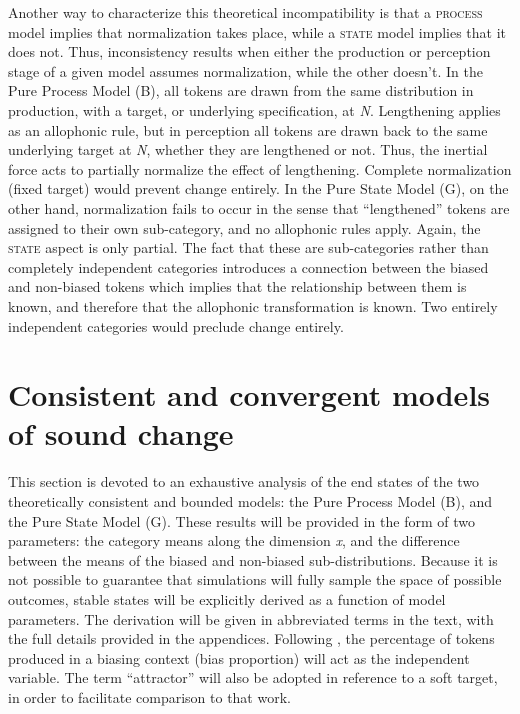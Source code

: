 Another way to characterize this theoretical incompatibility is that
a \textsc{process} model implies that normalization takes place, while
a \textsc{state} model implies that it does not. Thus, inconsistency
results when either the production or perception stage of a given
model assumes normalization, while the other doesn't. In the Pure
Process Model (B), all tokens are drawn from the same distribution
in production, with a target, or underlying specification, at \emph{N}.
Lengthening applies as an allophonic rule, but in perception all tokens
are drawn back to the same underlying target at \emph{N}, whether
they are lengthened or not. Thus, the inertial force acts to partially
normalize the effect of lengthening. Complete normalization (fixed
target) would prevent change entirely. In the Pure State Model (G),
on the other hand, normalization fails to occur in the sense that
``lengthened'' tokens are assigned to their own sub-category, and no
allophonic rules apply. Again, the \textsc{state} aspect is only partial.
The fact that these are sub-categories rather than completely independent
categories introduces a connection between the biased and non-biased
tokens which implies that the relationship between them is known,
and therefore that the allophonic transformation is known. Two entirely
independent categories would preclude change entirely. 

\section{\label{sec:Model-Behavior}Consistent and convergent models of sound change}

This section is devoted to an exhaustive analysis of the end states
of the two theoretically consistent and bounded models: the Pure Process
Model (B), and the Pure State Model (G). These results will be provided
in the form of two parameters: the category means along the dimension
\emph{x}, and the difference between the means of the biased and non-biased
sub-distributions. Because it is not possible to guarantee that simulations
will fully sample the space of possible outcomes, stable states will
be explicitly derived as a function of model parameters. The derivation
will be given in abbreviated terms in the text, with the full details
provided in the appendices. Following \citet{soskuthy2013phonetic,Soskuthy2015},
the percentage of tokens produced in a biasing context (bias proportion)
will act as the independent variable. The term “attractor” will
also be adopted in reference to a soft target, in order to facilitate
comparison to that work. 

